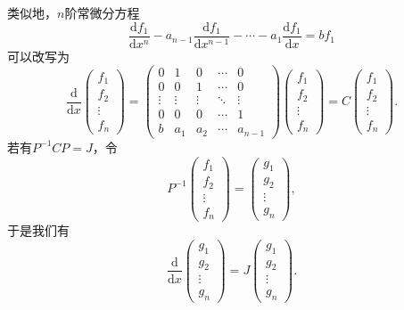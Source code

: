 类似地，$n$阶常微分方程
\[\dfrac{\mathrm{d}f_1}{\mathrm{d}x^n}-a_{n-1}\dfrac{\mathrm{d}f_1}{\mathrm{d}x^{n-1}}-\cdots-a_1\dfrac{\mathrm{d}f_1}{\mathrm{d}x}=bf_1\]
可以改写为
\[\dfrac{\mathrm{d}}{\mathrm{d}x}\begin{pmatrix}
        f_1 \\ f_2 \\ \vdots \\ f_n
    \end{pmatrix}=\begin{pmatrix}
        0      & 1      & 0      & \cdots & 0       \\
        0      & 0      & 1      & \cdots & 0       \\
        \vdots & \vdots & \vdots & \ddots & \vdots  \\
        0      & 0      & 0      & \cdots & 1       \\
        b      & a_1    & a_2    & \cdots & a_{n-1}
    \end{pmatrix}\begin{pmatrix}
        f_1 \\ f_2 \\ \vdots \\ f_n
    \end{pmatrix}=C\begin{pmatrix}
        f_1 \\ f_2 \\ \vdots \\ f_n
    \end{pmatrix}.\]
若有$P^{-1}CP=J$，令
\[P^{-1}\begin{pmatrix}
        f_1 \\ f_2 \\ \vdots \\ f_n
    \end{pmatrix}=\begin{pmatrix}
        g_1 \\ g_2 \\ \vdots \\ g_n
    \end{pmatrix},\]
于是我们有
\[\dfrac{\mathrm{d}}{\mathrm{d}x}\begin{pmatrix}
        g_1 \\ g_2 \\ \vdots \\ g_n
    \end{pmatrix}=J\begin{pmatrix}
        g_1 \\ g_2 \\ \vdots \\ g_n
    \end{pmatrix}.\]

